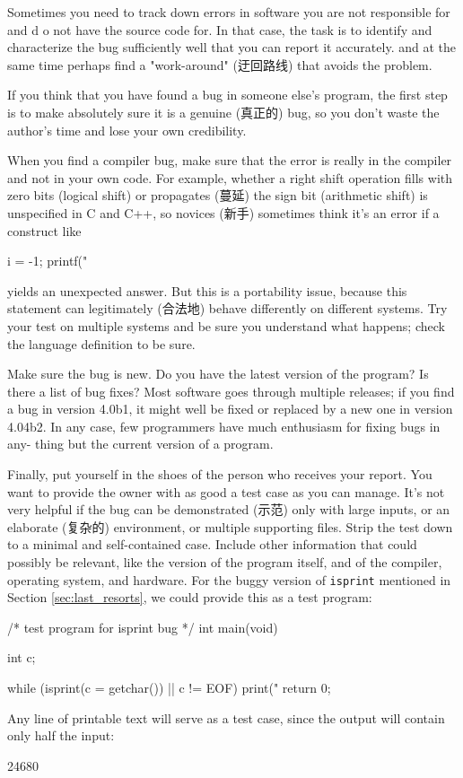 Sometimes you need to track down errors in software you are not responsible
for and d o not have the source code for. In that case, the task is to
identify and characterize the bug sufficiently well that you can report it
accurately. and at the same time perhaps find a "work-around" (迂回路线)
that avoids the problem.

If you think that you have found a bug in someone else's program, the first
step is to make absolutely sure it is a genuine (真正的) bug, so you don't
waste the author's time and lose your own credibility.

When you find a compiler bug, make sure that the error is really in the
compiler and not in your own code. For example, whether a right shift
operation fills with zero bits (logical shift) or propagates (蔓延) the
sign bit (arithmetic shift) is unspecified in C and C++, so novices (新手)
sometimes think it's an error if a construct like
\begin{badcode}
    i = -1;
    printf("%
\end{badcode}
yields an unexpected answer. But this is a portability issue, because this
statement can legitimately (合法地) behave differently on different
systems. Try your test on multiple systems and be sure you understand what
happens; check the language definition to be sure.

Make sure the bug is new. Do you have the latest version of the program? Is
there a list of bug fixes? Most software goes through multiple releases;
if you find a bug in version 4.0b1, it might well be fixed or replaced by a
new one in version 4.04b2. In any case, few programmers have much
enthusiasm for fixing bugs in any- thing but the current version of a
program.

Finally, put yourself in the shoes of the person who receives your report.
You want to provide the owner with as good a test case as you can manage.
It's not very helpful if the bug can be demonstrated (示范) only with large
inputs, or an elaborate (复杂的) environment, or multiple supporting files.
Strip the test down to a minimal and self-contained case. Include other
information that could possibly be relevant, like the version of the
program itself, and of the compiler, operating system, and hardware.  For
the buggy version of \verb'isprint' mentioned in Section
\ref{sec:last_resorts}, we could provide this as a test program:
\begin{wellcode}
    /* test program for isprint bug */
    int main(void)
    {
        int c;

        while (isprint(c = getchar()) || c != EOF)
            print("%
        return 0;
    }
\end{wellcode}
Any line of printable text will serve as a test case, since the output will
contain only half the input:
\begin{wellcode}
    24680
\end{wellcode}

